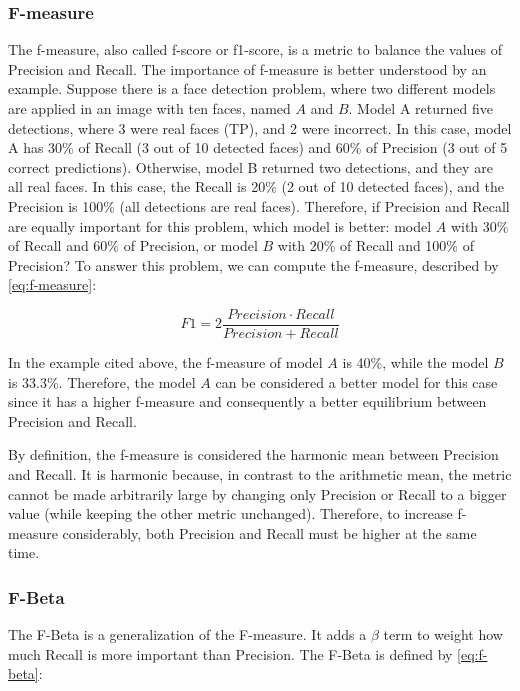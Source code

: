 \subsubsection{F-measure}

The f-measure, also called f-score or f1-score, is a metric to balance the values of Precision and Recall. The importance of f-measure is better understood by an example. Suppose there is a face detection problem, where two different models are applied in an image with ten faces, named $A$ and $B$. Model A returned five detections, where 3 were real faces (TP), and 2 were incorrect. In this case, model A has 30\% of Recall (3 out of 10 detected faces) and 60\% of Precision (3 out of 5 correct predictions). Otherwise, model B returned two detections, and they are all real faces. In this case, the Recall is 20\% (2 out of 10 detected faces), and the Precision is 100\% (all detections are real faces). Therefore, if Precision and Recall are equally important for this problem, which model is better: model $A$ with 30\% of Recall and 60\% of Precision, or model $B$ with 20\% of Recall and 100\% of Precision? To answer this problem, we can compute the f-measure, described by \autoref{eq:f-measure}: 

\begin{equation}
\label{eq:f-measure}
F1 = 2\frac{Precision \cdot Recall}{Precision + Recall}
\end{equation}

In the example cited above, the f-measure of model $A$ is 40\%, while the model $B$ is 33.3\%. Therefore, the model $A$ can be considered a better model for this case since it has a higher f-measure and consequently a better equilibrium between Precision and Recall.

By definition, the f-measure is considered the harmonic mean between Precision and Recall. It is harmonic because, in contrast to the arithmetic mean, the metric cannot be made arbitrarily large by changing only Precision or Recall to a bigger value (while keeping the other metric unchanged). Therefore, to increase f-measure considerably, both Precision and Recall must be higher at the same time.

\subsubsection{F-Beta}

The F-Beta is a generalization of the F-measure. It adds a $\beta$ term to weight how much Recall is more important than Precision. The F-Beta is defined by \autoref{eq:f-beta}:

